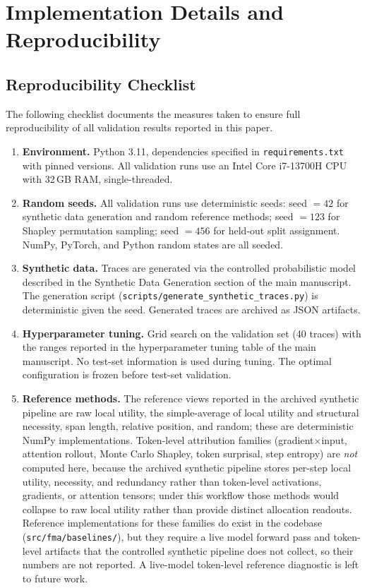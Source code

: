 \documentclass[a4paper,fleqn]{cas-sc}
\begin{document}
\section{Implementation Details and Reproducibility}
\label{app:implementation}

\subsection{Reproducibility Checklist}
\label{app:repro-checklist}

The following checklist documents the measures taken to ensure full reproducibility of all validation results reported in this paper.

\begin{enumerate}
\item \textbf{Environment.} Python 3.11, dependencies specified in \texttt{requirements.txt} with pinned versions. All validation runs use an Intel Core i7-13700H CPU with 32\,GB RAM, single-threaded.
\item \textbf{Random seeds.} All validation runs use deterministic seeds: seed $= 42$ for synthetic data generation and random reference methods; seed $= 123$ for Shapley permutation sampling; seed $= 456$ for held-out split assignment. NumPy, PyTorch, and Python random states are all seeded.
\item \textbf{Synthetic data.} Traces are generated via the controlled probabilistic model described in the Synthetic Data Generation section of the main manuscript. The generation script (\texttt{scripts/generate\_synthetic\_traces.py}) is deterministic given the seed. Generated traces are archived as JSON artifacts.
\item \textbf{Hyperparameter tuning.} Grid search on the validation set (40 traces) with the ranges reported in the hyperparameter tuning table of the main manuscript. No test-set information is used during tuning. The optimal configuration is frozen before test-set validation.
\item \textbf{Reference methods.} The reference views reported in the archived synthetic pipeline are raw local utility, the simple-average of local utility and structural necessity, span length, relative position, and random; these are deterministic NumPy implementations. Token-level attribution families (gradient$\times$input, attention rollout, Monte Carlo Shapley, token surprisal, step entropy) are \emph{not} computed here, because the archived synthetic pipeline stores per-step local utility, necessity, and redundancy rather than token-level activations, gradients, or attention tensors; under this workflow those methods would collapse to raw local utility rather than provide distinct allocation readouts. Reference implementations for these families do exist in the codebase (\texttt{src/fma/baselines/}), but they require a live model forward pass and token-level artifacts that the controlled synthetic pipeline does not collect, so their numbers are not reported. A live-model token-level reference diagnostic is left to future work.

\end{enumerate}
\end{document}
